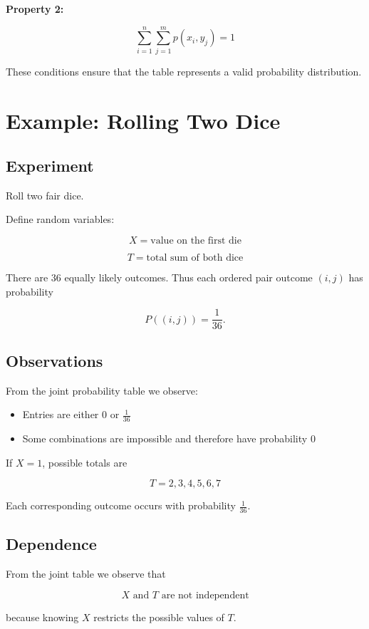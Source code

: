 \documentclass[12pt]{article}
\begin{document}
\textbf{Property 2:}

\[
\sum_{i=1}^{n} \sum_{j=1}^{m} p(x_i,y_j) = 1
\]

These conditions ensure that the table represents a valid probability distribution.

\section{Example: Rolling Two Dice}

\subsection{Experiment}

Roll two fair dice.

Define random variables:

\[
X = \text{value on the first die}
\]

\[
T = \text{total sum of both dice}
\]

There are $36$ equally likely outcomes. Thus each ordered pair outcome $(i,j)$ has probability

\[
P((i,j)) = \frac{1}{36}.
\]

\subsection{Observations}

From the joint probability table we observe:

\begin{itemize}
\item Entries are either $0$ or $\frac{1}{36}$
\item Some combinations are impossible and therefore have probability $0$
\end{itemize}

If $X=1$, possible totals are

\[
T = 2,3,4,5,6,7
\]

Each corresponding outcome occurs with probability $\frac{1}{36}$.

\subsection{Dependence}

From the joint table we observe that

\[
X \text{ and } T \text{ are not independent}
\]

because knowing $X$ restricts the possible values of $T$.
\end{document}
